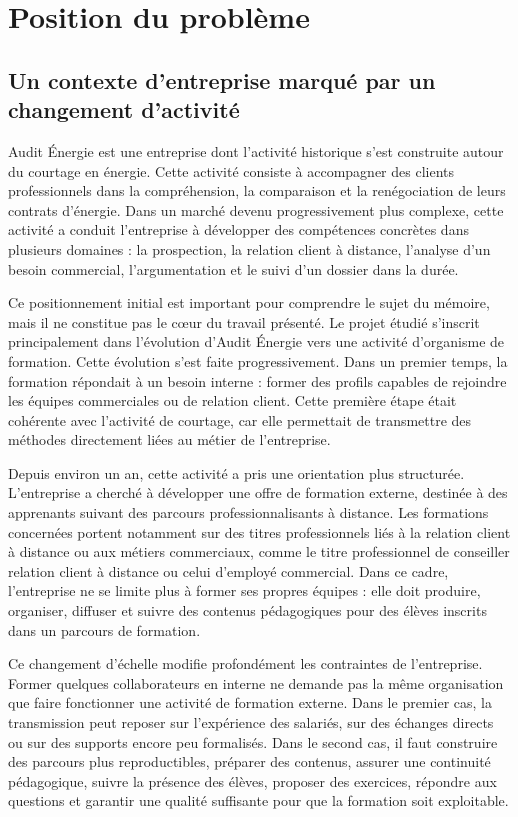 \section{Position du problème}

\subsection{Un contexte d'entreprise marqué par un changement d'activité}

Audit Énergie est une entreprise dont l'activité historique s'est construite autour du
courtage en énergie. Cette activité consiste à accompagner des clients professionnels dans
la compréhension, la comparaison et la renégociation de leurs contrats d'énergie. Dans
un marché devenu progressivement plus complexe, cette activité a conduit l'entreprise à
développer des compétences concrètes dans plusieurs domaines : la prospection, la
relation client à distance, l'analyse d'un besoin commercial, l'argumentation et le suivi
d'un dossier dans la durée.

Ce positionnement initial est important pour comprendre le sujet du mémoire, mais il ne
constitue pas le cœur du travail présenté. Le projet étudié s'inscrit principalement dans
l'évolution d'Audit Énergie vers une activité d'organisme de formation. Cette évolution
s'est faite progressivement. Dans un premier temps, la formation répondait à un besoin
interne : former des profils capables de rejoindre les équipes commerciales ou de relation
client. Cette première étape était cohérente avec l'activité de courtage, car elle permettait
de transmettre des méthodes directement liées au métier de l'entreprise.

Depuis environ un an, cette activité a pris une orientation plus structurée. L'entreprise a
cherché à développer une offre de formation externe, destinée à des apprenants suivant
des parcours professionnalisants à distance. Les formations concernées portent notamment
sur des titres professionnels liés à la relation client à distance ou aux métiers commerciaux,
comme le titre professionnel de conseiller relation client à distance ou celui d'employé
commercial. Dans ce cadre, l'entreprise ne se limite plus à former ses propres équipes :
elle doit produire, organiser, diffuser et suivre des contenus pédagogiques pour des élèves
inscrits dans un parcours de formation.

Ce changement d'échelle modifie profondément les contraintes de l'entreprise. Former
quelques collaborateurs en interne ne demande pas la même organisation que faire
fonctionner une activité de formation externe. Dans le premier cas, la transmission peut
reposer sur l'expérience des salariés, sur des échanges directs ou sur des supports encore
peu formalisés. Dans le second cas, il faut construire des parcours plus reproductibles,
préparer des contenus, assurer une continuité pédagogique, suivre la présence des élèves,
proposer des exercices, répondre aux questions et garantir une qualité suffisante pour que
la formation soit exploitable.

